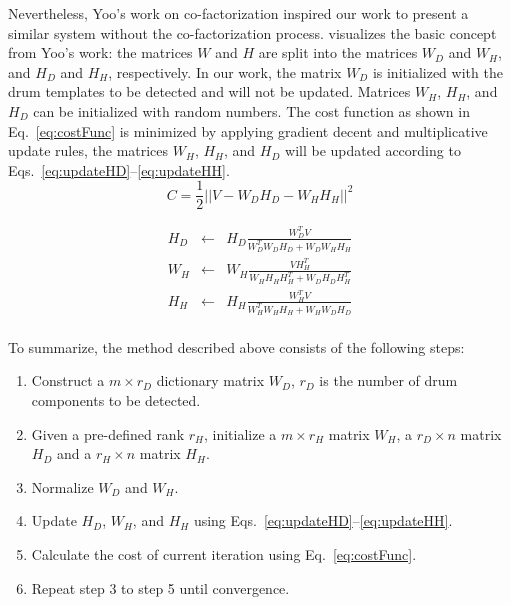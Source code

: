 \documentclass{article}
\begin{document}
Nevertheless, Yoo's work on co-factorization inspired our work to present a similar system without the co-factorization process.  visualizes the basic concept from Yoo's work: the matrices $W$ and $H$ are split into the  matrices $W_D$ and $W_H$, and  $H_D$ and $H_H$, respectively. 
In our work, the matrix $W_D$ is initialized with the drum templates to be detected and will not be updated. Matrices $W_H$, $H_H$, and $H_D$ can be initialized with random numbers. 
The cost function as shown in Eq.~\eqref{eq:costFunc} is minimized by applying gradient decent and multiplicative update rules, the matrices  $W_H$, $H_H$, and $H_D$ will be updated according to Eqs.~\eqref{eq:updateHD}--\eqref{eq:updateHH}.  %
\begin{equation}
C = \frac{1}{2} || V - W_{D}H_{D} - W_{H}H_{H}||^{2}
\label{eq:costFunc}
\end{equation}

\begin{eqnarray}\label{eq1}
H_{D} &\leftarrow& H_{D}\frac{W_{D} ^T V}{W_{D}^T W_{D} H_{D} + W_{D} W_{H} H_{H}}\\
\label{eq:updateHD}
%
W_{H} &\leftarrow& W_{H}\frac{V H_{H}^T}{W_{H} H_{H} H_{H}^T + W_{D} H_{D} H_{H}^T}\\
\label{eq:updateWH}
%
H_{H} &\leftarrow& H_{H}\frac{W_{H}^T V}{W_{H}^T W_{H} H_{H} + W_{H} W_{D} H_{D}}
\label{eq:updateHH}
\end{eqnarray}\\


To summarize, the method described above consists of the following steps:
\begin{enumerate}
    \item   Construct a $m \times r_D$ dictionary matrix $W_D$, $r_D$ is the number of drum components to be detected.
    \item   Given a pre-defined rank $r_H$, initialize a $m \times r_H$ matrix $W_H$, a $r_D \times n$ matrix $H_D$ and a $r_H \times n$ matrix $H_H$.
    \item   Normalize $W_D$ and $W_H$. 
    \item   Update $H_D$, $W_H$, and $H_H$ using Eqs.~\eqref{eq:updateHD}--\eqref{eq:updateHH}.
    \item   Calculate the cost of current iteration using Eq.~\eqref{eq:costFunc}.
    \item   Repeat step 3 to step 5 until convergence.
\end{enumerate}
\end{document}
